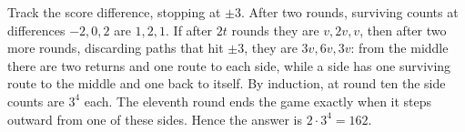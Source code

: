 Track the score difference, stopping at $\pm3$. After two rounds, surviving counts at differences $-2,0,2$ are $1,2,1$. If after $2t$ rounds they are $v,2v,v$, then after two more rounds, discarding paths that hit $\pm3$, they are $3v,6v,3v$: from the middle there are two returns and one route to each side, while a side has one surviving route to the middle and one back to itself. By induction, at round ten the side counts are $3^4$ each. The eleventh round ends the game exactly when it steps outward from one of these sides. Hence the answer is $\boxed{2\cdot3^4=162}$.
